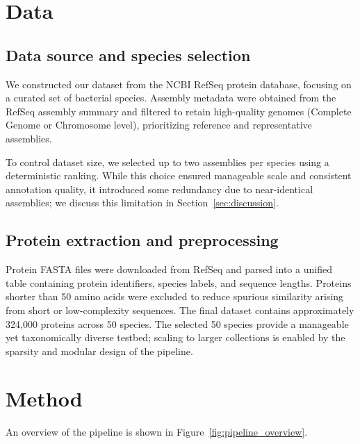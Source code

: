 \documentclass[11pt]{article}
\begin{document}
\section{Data}

\subsection{Data source and species selection}
We constructed our dataset from the NCBI RefSeq protein database, focusing on a curated set of bacterial species. Assembly metadata were obtained from the RefSeq assembly summary and filtered to retain high-quality genomes (Complete Genome or Chromosome level), prioritizing reference and representative assemblies.

To control dataset size, we selected up to two assemblies per species using a deterministic ranking. While this choice ensured manageable scale and consistent annotation quality, it introduced some redundancy due to near-identical assemblies; we discuss this limitation in Section~\ref{sec:discussion}.

\subsection{Protein extraction and preprocessing}
Protein FASTA files were downloaded from RefSeq and parsed into a unified table containing protein identifiers, species labels, and sequence lengths. Proteins shorter than 50 amino acids were excluded to reduce spurious similarity arising from short or low-complexity sequences. The final dataset contains approximately 324{,}000 proteins across 50 species. The selected 50 species provide a manageable yet taxonomically diverse testbed; scaling to larger collections is enabled by the sparsity and modular design of the pipeline.

\section{Method}

An overview of the pipeline is shown in Figure~\ref{fig:pipeline_overview}.
\end{document}

